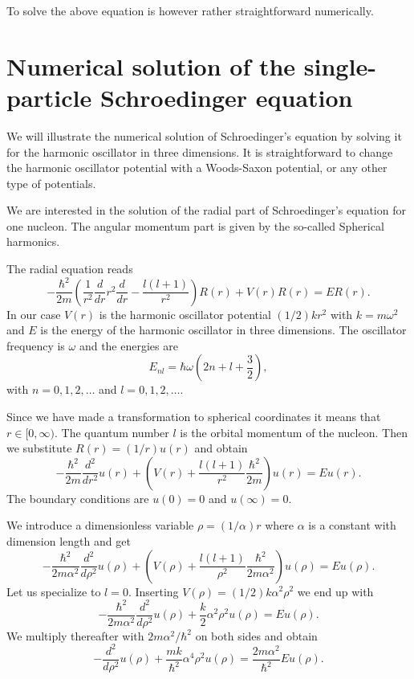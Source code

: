\documentclass[%
twoside,                 %
final,                   %
10pt]{article}
\begin{document}
To solve the above equation is however rather straightforward numerically. 



\section*{Numerical solution of the single-particle Schroedinger equation}

We will illustrate the numerical solution of Schroedinger's equation by solving it for the harmonic oscillator in three dimensions.
It is straightforward to change the harmonic oscillator potential with a Woods-Saxon potential, or any other type of potentials. 

We are interested in the solution of the radial part of Schroedinger's equation for one nucleon. 
The angular momentum part  is given by the so-called Spherical harmonics. 

The radial equation reads
\[
  -\frac{\hbar^2}{2 m} \left ( \frac{1}{r^2} \frac{d}{dr} r^2
  \frac{d}{dr} - \frac{l (l + 1)}{r^2} \right )R(r) 
     + V(r) R(r) = E R(r).
\]
In our case $V(r)$ is the harmonic oscillator potential $(1/2)kr^2$ with
$k=m\omega^2$ and $E$ is
the energy of the harmonic oscillator in three dimensions.
The oscillator frequency is $\omega$ and the energies are
\[
E_{nl}=  \hbar \omega \left(2n+l+\frac{3}{2}\right),
\]
with $n=0,1,2,\dots$ and $l=0,1,2,\dots$.



Since we have made a transformation to spherical coordinates it means that 
$r\in [0,\infty)$.  
The quantum number
$l$ is the orbital momentum of the nucleon.   Then we substitute $R(r) = (1/r) u(r)$ and obtain
\[
  -\frac{\hbar^2}{2 m} \frac{d^2}{dr^2} u(r) 
       + \left ( V(r) + \frac{l (l + 1)}{r^2}\frac{\hbar^2}{2 m}
                                    \right ) u(r)  = E u(r) .
\]
The boundary conditions are $u(0)=0$ and $u(\infty)=0$.




We introduce a dimensionless variable $\rho = (1/\alpha) r$
where $\alpha$ is a constant with dimension length and get
\[
  -\frac{\hbar^2}{2 m \alpha^2} \frac{d^2}{d\rho^2} u(\rho) 
       + \left ( V(\rho) + \frac{l (l + 1)}{\rho^2}
         \frac{\hbar^2}{2 m\alpha^2} \right ) u(\rho)  = E u(\rho) .
\]
Let us specialize to $l=0$. 
Inserting $V(\rho) = (1/2) k \alpha^2\rho^2$ we end up with
\[
  -\frac{\hbar^2}{2 m \alpha^2} \frac{d^2}{d\rho^2} u(\rho) 
       + \frac{k}{2} \alpha^2\rho^2u(\rho)  = E u(\rho) .
\]
We multiply thereafter with $2m\alpha^2/\hbar^2$ on both sides and obtain
\[
  -\frac{d^2}{d\rho^2} u(\rho) 
       + \frac{mk}{\hbar^2} \alpha^4\rho^2u(\rho)  = \frac{2m\alpha^2}{\hbar^2}E u(\rho) .
\]
\end{document}
